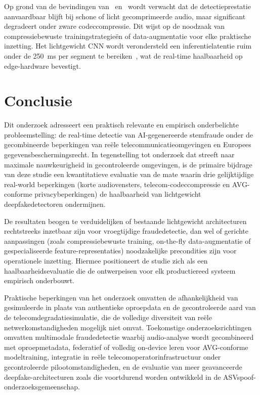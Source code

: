 \documentclass{hogent-article}
\begin{document}
Op grond van de bevindingen van~\textcite{Li2025} en~\textcite{Shi2025}
wordt verwacht dat de detectieprestatie aanvaardbaar blijft bij schone of licht
gecomprimeerde audio, maar significant degradeert onder zware codeccompressie.
Dit wijst op de noodzaak van compressiebewuste trainingstrategieën of
data-augmentatie voor elke praktische inzetting. Het lichtgewicht CNN wordt
verondersteld een inferentielatentie ruim onder de 250~ms per segment te
bereiken~\autocite{Amiriparian2022}, wat de real-time haalbaarheid op
edge-hardware bevestigt.

\section{Conclusie}%
\label{sec:conclusie}

Dit onderzoek adresseert een praktisch relevante en empirisch onderbelichte
probleemstelling: de real-time detectie van AI-gegenereerde stemfraude onder de
gecombineerde beperkingen van reële telecommunicatieomgevingen en Europees
gegevensbeschermingsrecht. In tegenstelling tot onderzoek dat streeft naar
maximale nauwkeurigheid in gecontroleerde omgevingen, is de primaire bijdrage
van deze studie een kwantitatieve evaluatie van de mate waarin drie gelijktijdige
real-world beperkingen (korte audiovensters, telecom-codeccompressie en
AVG-conforme privacybeperkingen) de haalbaarheid van lichtgewicht deepfake\-detectoren
ondermijnen.

De resultaten beogen te verduidelijken of bestaande lichtgewicht architecturen
rechtstreeks inzetbaar zijn voor vroegtijdige fraudedetectie, dan wel of gerichte
aanpassingen (zoals compressiebewuste training, on-the-fly data-augmentatie of
gespecialiseerde feature-representaties) noodzakelijke precondities zijn voor
operationele inzetting. Hiermee positioneert de studie zich als een
haalbaarheidsevaluatie die de ontwerpeisen voor elk productiereed systeem
empirisch onderbouwt.

Praktische beperkingen van het onderzoek omvatten de afhankelijkheid van
gesimuleerde in plaats van authentieke oproepdata en de gecontroleerde aard van
de telecomdegradatiesimulatie, die de volledige diversiteit van reële netwerk\-omstandigheden
mogelijk niet omvat. Toekomstige onderzoeksrichtingen omvatten multimodale
fraudedetectie waarbij audio-analyse wordt gecombineerd met oproepmetadata,
federatief of volledig on-device leren voor AVG-conforme modeltraining, integratie
in reële telecomoperatorinfrastructuur onder gecontroleerde pilootomstandigheden,
en de evaluatie van meer geavanceerde deepfake-architecturen zoals die voortdurend
worden ontwikkeld in de ASVspoof-onderzoeksgemeenschap.

\printbibliography[heading=bibintoc]
\end{document}
